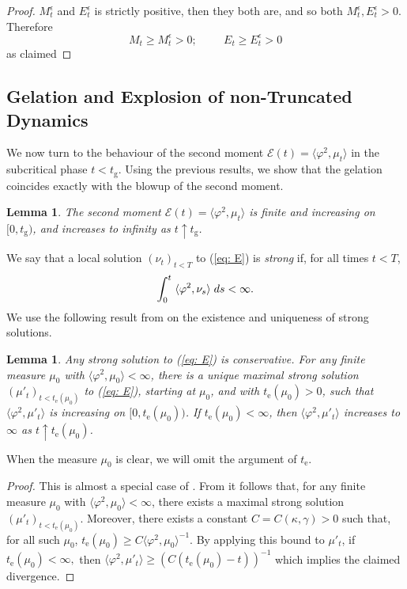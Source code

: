 \documentclass[11pt, notitlepage]{article}
\newtheorem{lem}[thm]{Lemma}
\begin{document}
\begin{proof}
$M^\epsilon_t$ and $E^\epsilon_t$ is strictly positive, then they both are, and so both $M^\epsilon_t, E^\epsilon_t>0$. Therefore \begin{equation} M_t\ge M^\epsilon_t >0;\hspace{1cm} E_t\ge E^\epsilon_t >0 \end{equation} as claimed \end{proof}
\subsection{\textbf{Gelation and Explosion of non-Truncated Dynamics}} We now turn to the behaviour of the second moment $\mathcal{E}(t)=\langle \varphi^2, \mu_t\rangle$ in the subcritical phase $t<t_\mathrm{g}$. Using the previous results, we show that the gelation coincides exactly with the blowup of the second moment. 
\begin{lem}\label{lemma: second moment before tgel} The second moment $\mathcal{E}(t)=\langle \varphi^2, \mu_t\rangle$ is finite and increasing on $[0, t_\mathrm{g})$, and increases to infinity as $t\uparrow t_\mathrm{g}$. \end{lem}  We say that a local solution $(\nu_t)_{t<T}$ to (\ref{eq: E}) is \emph{strong} if, for all times $t<T$, 
\begin{equation}
    \int_0^t  \hspace{0.1cm} \langle\varphi^2, \nu_s\rangle  \hspace{0.1cm} ds<\infty.
\end{equation} We use the following result from \cite{N00} on the existence and uniqueness of strong solutions. 
\begin{lem}\label{lemma: strong solutions} Any strong solution to (\ref{eq: E}) is conservative. For any finite measure $\mu_0$ with $\langle \varphi^2, \mu_0\rangle <\infty$, there is a unique maximal strong solution $(\mu'_t)_{t<t_\mathrm{e}(\mu_0)}$ to (\ref{eq: E}), starting at $\mu_0$, and with $t_\mathrm{e}(\mu_0)>0$, such that $ \langle \varphi^2, \mu'_t\rangle$ is increasing on $[0,t_\mathrm{e}(\mu_0))$. If $t_\mathrm{e}(\mu_0)<\infty$, then $\langle \varphi^2, \mu'_t\rangle$ increases to $\infty$  as $t\uparrow t_\mathrm{e}(\mu_0)$.  \end{lem} When the measure $\mu_0$ is clear, we will omit the argument of $t_\mathrm{e}.$ 
\begin{proof}
    This is almost a special case of \cite[Thrm. 2.1]{N00}. From \cite[Theorem 2.1]{N00} it follows that, for any finite measure $\mu_0$ with $\langle \varphi^2, \mu_0\rangle <\infty$, there exists a maximal strong solution $(\mu'_t)_{t<t_\mathrm{e}(\mu_0)}$. Moreover, there exists a constant $C=C(\kappa, \gamma)>0$ such that, for all such $\mu_0$,  $t_\mathrm{e}(\mu_0) \ge C \langle \varphi^2, \mu_0\rangle^{-1}$. By applying this bound to $\mu'_t$, if $t_\mathrm{e}(\mu_0)<\infty,$ then $\langle \varphi^2, \mu'_t\rangle \ge (C(t_\mathrm{e}(\mu_0)-t))^{-1}$  which implies the claimed divergence.
\end{proof}
\end{document}
